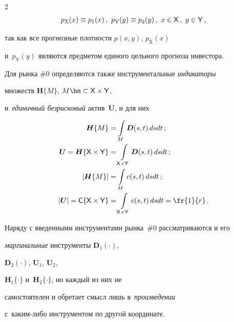 \begin{multicols}{2}
  $$


  p_{\mathrm{X}}(x)\equiv p_1(x)\,,\ p_{\mathrm{Y}}(y)\equiv p_2(y)\,,\ x\in{\sf 


X}\,,\ y\in{\sf Y}\,,


  $$


так как все прогнозные плотности $p(x, y)$, $p_{\mathrm{X}}(x)$ 


и~$p_{\mathrm{Y}}(y)$ являются предметом единого цельного прогноза инвестора. 





  Для рынка \#0 определяются также инструментальные \textit{индикаторы} 


множеств $\boldsymbol{H}\{M\}$, $M \hm\subset {\sf X}\times{\sf Y}$, 


и~\textit{единичный безрисковый} актив~$\boldsymbol{U}$, и для них 


  \begin{align*}


  \boldsymbol{H}\{M\} &=\int\limits_M \boldsymbol{D}(s,t)\,dsdt\,;\\


  \boldsymbol{U}=\boldsymbol{H}\{{\sf X}\times {\sf Y}\} &=\int\limits_{{\sf 


X}\times{\sf Y}} \boldsymbol{D}(s,t)\,dsdt\,;\\


  \left\vert \boldsymbol{H}\{M\}\right\vert


  & =\int\limits_M c(s,t)\,dsdt\,;\\


     \vert \boldsymbol{U}\vert ={\sf C}\{{\sf X}\times {\sf Y}\}& =\int\limits_{{\sf 


X}\times{\sf Y}} c(s,t)\,dsdt =\fr{1}{r}\,.


  \end{align*}


  


  Наряду с введенными инструментами рынка~\#0 рассматриваются и его 


\textit{маргинальные} инструменты $\boldsymbol{D}_1(\cdot)$, 


$\boldsymbol{D}_2(\cdot)$, $\boldsymbol{U}_1$, $\boldsymbol{U}_2$, 


$\boldsymbol{H}_1\{\cdot\}$ и~$\boldsymbol{H}_2\{\cdot\}$, но каждый из них не 


самостоятелен и обретает смысл лишь в~\textit{произведении}  


с~ка\-ким-ли\-бо инструментом по другой координате.



\end{multicols}
